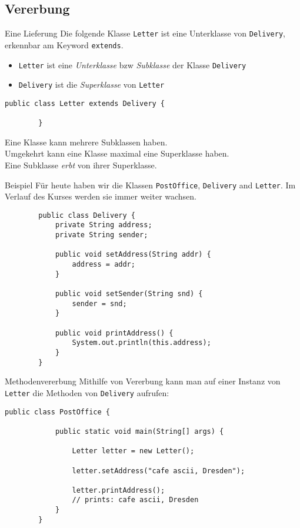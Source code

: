 \subsection{Vererbung}
\begin{frame}[fragile]{Eine Lieferung}
    Die folgende Klasse \texttt{Letter} ist eine Unterklasse von \texttt{Delivery}, erkennbar am Keyword \texttt{extends}.
	\begin{itemize}
        \item \texttt{Letter} ist eine \textit{Unterklasse} bzw \textit{Subklasse} der Klasse \texttt{Delivery}
		\item \texttt{Delivery} ist die \textit{Superklasse} von \texttt{Letter}
	\end{itemize}
    \begin{lstlisting}[gobble=8]
        public class Letter extends Delivery {
        
        }
	\end{lstlisting}
	\vfill
    \pause
	Eine Klasse kann mehrere Subklassen haben. \\
    Umgekehrt kann eine Klasse maximal eine Superklasse haben. \\
    Eine Subklasse \textit{erbt} von ihrer Superklasse.
\end{frame}

\begin{frame}[fragile]{Beispiel}
    Für heute haben wir die Klassen \texttt{PostOffice}, \texttt{Delivery} and \texttt{Letter}.
    Im Verlauf des Kurses werden sie immer weiter wachsen.
	\begin{lstlisting}
        public class Delivery {
            private String address;
            private String sender;
            
            public void setAddress(String addr) {
                address = addr;
            }
            
            public void setSender(String snd) {
                sender = snd;
            }
            
            public void printAddress() {
                System.out.println(this.address);
            }
        }
	\end{lstlisting}
\end{frame}

\begin{frame}[fragile]{Methodenvererbung}
	Mithilfe von Vererbung kann man auf einer Instanz von \texttt{Letter} die Methoden von \texttt{Delivery} aufrufen:
    \begin{lstlisting}[gobble=8]
        public class PostOffice {
        
            public static void main(String[] args) {
            
                Letter letter = new Letter();
                
                letter.setAddress("cafe ascii, Dresden");
                
                letter.printAddress();
                // prints: cafe ascii, Dresden
            }	
        }
	\end{lstlisting}
\end{frame}

